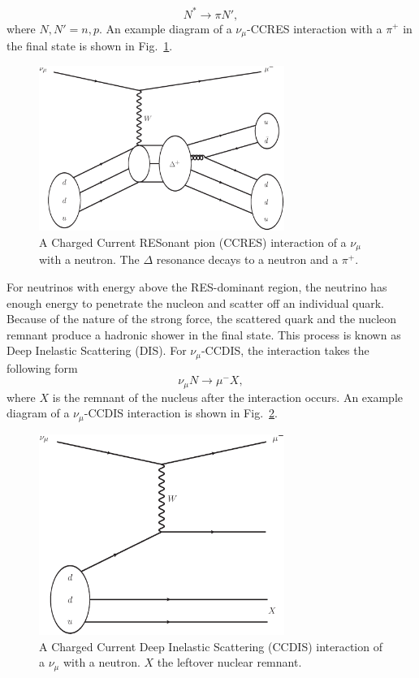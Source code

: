 \begin{equation}
N^{*} \rightarrow \pi N',
\end{equation}
where $N, N' = n, p$.  An example diagram of a $\nu_\mu$-CCRES interaction with a $\pi^+$ in the final state is shown in Fig.~\ref{fig:CCRESFD}.
\begin{figure}%
  \centering
  \includegraphics[width=8cm]{images/neutrino_interactions/CCRES_FD.eps}
  \caption{A Charged Current RESonant pion (CCRES) interaction of a $\nu_\mu$ with a neutron.  The $\Delta$ resonance decays to a neutron and a $\pi^+$.}
  \label{fig:CCRESFD}
\end{figure}
\newline
\newline
For neutrinos with energy above the RES-dominant region, the neutrino has enough energy to penetrate the nucleon and scatter off an individual quark.  Because of the nature of the strong force, the scattered quark and the nucleon remnant produce a hadronic shower in the final state.  This process is known as Deep Inelastic Scattering (DIS).  For $\nu_\mu$-CCDIS, the interaction takes the following form
\begin{equation}
\nu_\mu N \rightarrow \mu^- X,
\label{eq:CCDIS}
\end{equation}
where $X$ is the remnant of the nucleus after the interaction occurs.  An example diagram of a $\nu_\mu$-CCDIS interaction is shown in Fig.~\ref{fig:CCDISFG}.
\begin{figure}%
  \centering
  \includegraphics[width=8cm]{images/neutrino_interactions/CCDIS_FD.eps}
  \caption{A Charged Current Deep Inelastic Scattering (CCDIS) interaction of a $\nu_\mu$ with a neutron. $X$  the leftover nuclear remnant.}
  \label{fig:CCDISFG}
\end{figure}
